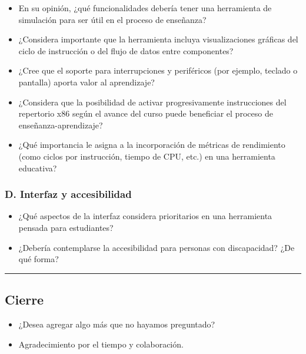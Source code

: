 \documentclass[12pt,oneside]{templates/unerthesis}
\providecommand{\tightlist}{%
  \setlength{\itemsep}{0pt}\setlength{\parskip}{0pt}}
\begin{document}
\begin{itemize}
\tightlist
\item
  En su opinión, ¿qué funcionalidades debería tener una herramienta de simulación para ser útil en el proceso de enseñanza?
\item
  ¿Considera importante que la herramienta incluya visualizaciones gráficas del ciclo de instrucción o del flujo de datos entre componentes?
\item
  ¿Cree que el soporte para interrupciones y periféricos (por ejemplo, teclado o pantalla) aporta valor al aprendizaje?
\item
  ¿Considera que la posibilidad de activar progresivamente instrucciones del repertorio x86 según el avance del curso puede beneficiar el proceso de enseñanza-aprendizaje?
\item
  ¿Qué importancia le asigna a la incorporación de métricas de rendimiento (como ciclos por instrucción, tiempo de CPU, etc.) en una herramienta educativa?
\end{itemize}

\hypertarget{d.-interfaz-y-accesibilidad}{%
\subsubsection{D. Interfaz y accesibilidad}\label{d.-interfaz-y-accesibilidad}}

\begin{itemize}
\tightlist
\item
  ¿Qué aspectos de la interfaz considera prioritarios en una herramienta pensada para estudiantes?
\item
  ¿Debería contemplarse la accesibilidad para personas con discapacidad? ¿De qué forma?
\end{itemize}

\begin{center}\rule{0.5\linewidth}{0.5pt}\end{center}

\hypertarget{cierre}{%
\subsection{Cierre}\label{cierre}}

\begin{itemize}
\tightlist
\item
  ¿Desea agregar algo más que no hayamos preguntado?
\item
  Agradecimiento por el tiempo y colaboración.
\end{itemize}
\end{document}
